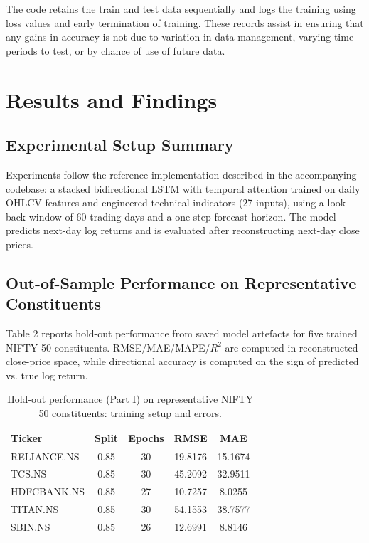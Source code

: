 \documentclass[conference]{IEEEtran}
\begin{document}
The code retains the train and test data sequentially and logs the training using loss values and early termination of training. These records assist in ensuring that any gains in accuracy is not due to variation in data management, varying time periods to test, or by chance of use of future data.

\FloatBarrier

\section{Results and Findings}

\FloatBarrier

\subsection{Experimental Setup Summary}

Experiments follow the reference implementation described in the accompanying codebase: a stacked bidirectional LSTM with temporal attention trained on daily OHLCV features and engineered technical indicators (27 inputs), using a look-back window of 60 trading days and a one-step forecast horizon. The model predicts next-day log returns and is evaluated after reconstructing next-day close prices.

\subsection{Out-of-Sample Performance on Representative Constituents}

Table 2 reports hold-out performance from saved model artefacts for five trained NIFTY 50 constituents. RMSE/MAE/MAPE/$R^2$ are computed in reconstructed close-price space, while directional accuracy is computed on the sign of predicted vs. true log return.

\begin{table}[H]
\caption{Hold-out performance (Part I) on representative NIFTY 50 constituents: training setup and errors.}
\label{tab:rep_results_a}
\raggedright
\small
\setlength{\tabcolsep}{6pt}
\renewcommand{\arraystretch}{1.1}
\begin{tabular}{lcccc}
\toprule
\textbf{Ticker} & \textbf{Split} & \textbf{Epochs} & \textbf{RMSE} & \textbf{MAE} \\
\midrule
RELIANCE.NS  & 0.85 & 30 & 19.8176 & 15.1674 \\
TCS.NS       & 0.85 & 30 & 45.2092 & 32.9511 \\
HDFCBANK.NS  & 0.85 & 27 & 10.7257 & 8.0255  \\
TITAN.NS     & 0.85 & 30 & 54.1553 & 38.7577 \\
SBIN.NS      & 0.85 & 26 & 12.6991 & 8.8146  \\
\bottomrule
\end{tabular}
\end{table}
\end{document}
